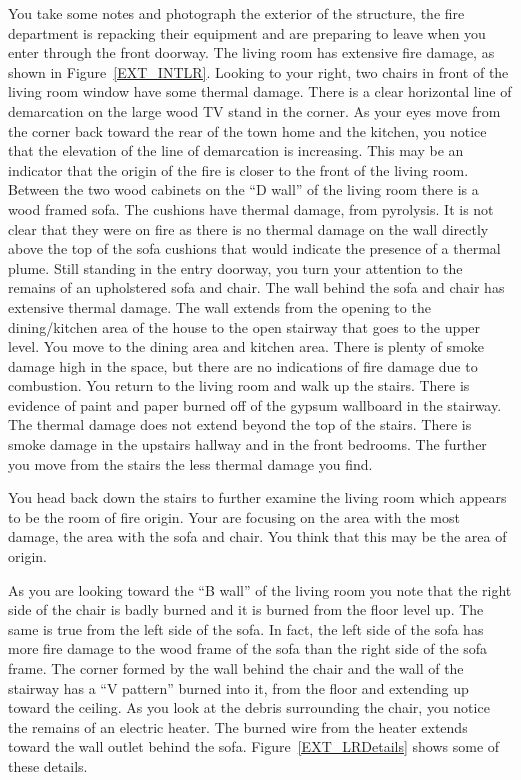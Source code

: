 \documentclass[twoside]{uocthesis}
\begin{document}
{You take some notes and photograph the exterior of the structure, the fire department is repacking their equipment and are preparing to leave when you enter through the front doorway.  The living room has extensive fire damage, as shown in Figure~\ref{EXT_INTLR}.  Looking to your right, two chairs in front of the living room window have some thermal damage.  There is a clear horizontal line of demarcation on the large wood TV stand in the corner.  As your eyes move from the corner back toward the rear of the town home and the kitchen, you notice that the elevation of the line of demarcation is increasing.  This may be an indicator that the origin of the fire is closer to the front of the living room.  Between the two wood cabinets on the ``D wall'' of the living room there is a wood framed sofa.  The cushions have thermal damage, from pyrolysis.  It is not clear that they were on fire as there is no thermal damage on the wall directly above the top of the sofa cushions that would indicate the presence of a thermal plume.  Still standing in the entry doorway, you turn your attention to the remains of an upholstered sofa and chair.  The wall behind the sofa and chair has extensive thermal damage.  The wall extends from the opening to the dining/kitchen area of the house to the open stairway that goes to the upper level.  You move to the dining area and kitchen area.  There is plenty of smoke damage high in the space, but there are no indications of fire damage due to combustion.  You return to the living room and walk up the stairs.  There is evidence of paint and paper burned off of the gypsum wallboard in the stairway.  The thermal damage does not extend beyond the top of the stairs.  There is smoke damage in the upstairs hallway and in the front bedrooms. The further you move from the stairs the less thermal damage you find.  

You head back down the stairs to further examine the living room which appears to be the room of fire origin. Your are focusing on the area with the most damage, the area with the sofa and chair.  You think that this may be the area of origin.  

As you are looking toward the ``B wall'' of the living room you note that the right side of the chair is badly burned and it is burned from the floor level up.  The same is true from the left side of the sofa.  In fact, the left side of the sofa has more fire damage to the wood frame of the sofa than the right side of the sofa frame.  The corner formed by the wall behind the chair and the wall of the stairway has a ``V pattern'' burned into it, from the floor and extending up toward the ceiling.  As you look at the debris surrounding the chair, you notice the remains of an electric heater.  The burned wire from the heater extends toward the wall outlet behind the sofa. Figure~\ref{EXT_LRDetails} shows some of these details.

}
\end{document}
